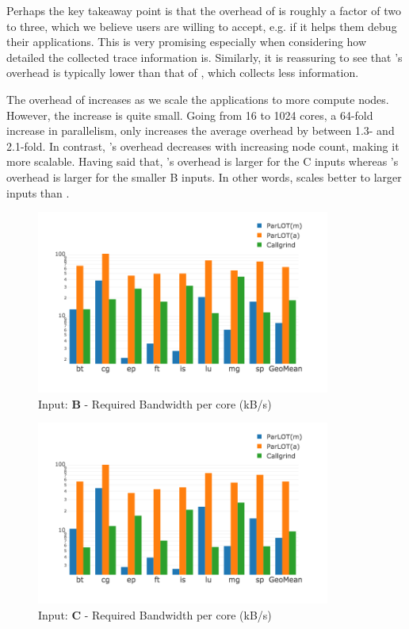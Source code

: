 Perhaps the key takeaway point is that the overhead of \parlot is roughly a factor of two to three, which we believe users are willing to accept, e.g. if it helps them debug their applications. This is very promising especially when considering how detailed the collected trace information is. Similarly, it is reassuring to see that \parlot 's overhead is typically lower than that of \callgrind, which collects less information.

The overhead of \parlot increases as we scale the applications to more compute nodes. However, the increase is quite small. Going from 16 to 1024 cores, a 64-fold increase in parallelism, only increases the average overhead by between 1.3- and 2.1-fold. In contrast, \callgrind 's overhead decreases with increasing node count, making it more scalable. Having said that, \callgrind 's overhead is larger for the C inputs whereas \parlot 's overhead is larger for the smaller B inputs. In other words, \parlot scales better to larger inputs than \callgrind.

\begin{figure}[t]
\centering
\includegraphics[width=3.8in]{figs.comet.newMed/comet_chartAvg_bw_B_p3_5.png}
\caption{ Input: \textbf{B} - Required Bandwidth per core (kB/s)
}
\label{comet_chartAvg_bw_B_p3_5}
\end{figure}


\begin{figure}[t]
\centering
\includegraphics[width=3.8in]{figs.comet.newMed/comet_chartAvg_bw_C_p3_5.png}
\caption{ Input: \textbf{C}  - Required Bandwidth per core (kB/s)
}
\label{comet_chartAvg_bw_C_p3_5}
\end{figure}


